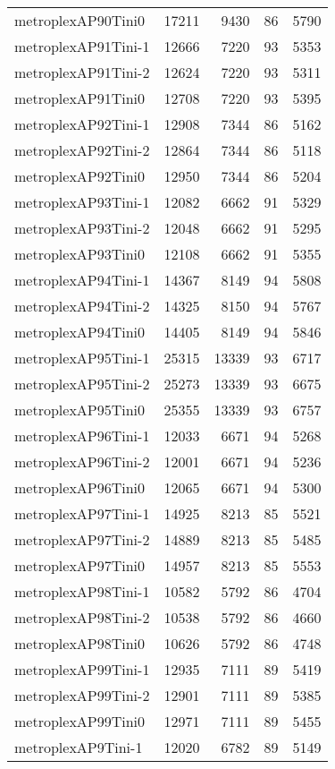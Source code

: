 \begin{longtable}{lrrrr}
metroplexAP90Tini0 & 17211 & 9430 & 86 & 5790 \\
metroplexAP91Tini-1 & 12666 & 7220 & 93 & 5353 \\
metroplexAP91Tini-2 & 12624 & 7220 & 93 & 5311 \\
metroplexAP91Tini0 & 12708 & 7220 & 93 & 5395 \\
metroplexAP92Tini-1 & 12908 & 7344 & 86 & 5162 \\
metroplexAP92Tini-2 & 12864 & 7344 & 86 & 5118 \\
metroplexAP92Tini0 & 12950 & 7344 & 86 & 5204 \\
metroplexAP93Tini-1 & 12082 & 6662 & 91 & 5329 \\
metroplexAP93Tini-2 & 12048 & 6662 & 91 & 5295 \\
metroplexAP93Tini0 & 12108 & 6662 & 91 & 5355 \\
metroplexAP94Tini-1 & 14367 & 8149 & 94 & 5808 \\
metroplexAP94Tini-2 & 14325 & 8150 & 94 & 5767 \\
metroplexAP94Tini0 & 14405 & 8149 & 94 & 5846 \\
metroplexAP95Tini-1 & 25315 & 13339 & 93 & 6717 \\
metroplexAP95Tini-2 & 25273 & 13339 & 93 & 6675 \\
metroplexAP95Tini0 & 25355 & 13339 & 93 & 6757 \\
metroplexAP96Tini-1 & 12033 & 6671 & 94 & 5268 \\
metroplexAP96Tini-2 & 12001 & 6671 & 94 & 5236 \\
metroplexAP96Tini0 & 12065 & 6671 & 94 & 5300 \\
metroplexAP97Tini-1 & 14925 & 8213 & 85 & 5521 \\
metroplexAP97Tini-2 & 14889 & 8213 & 85 & 5485 \\
metroplexAP97Tini0 & 14957 & 8213 & 85 & 5553 \\
metroplexAP98Tini-1 & 10582 & 5792 & 86 & 4704 \\
metroplexAP98Tini-2 & 10538 & 5792 & 86 & 4660 \\
metroplexAP98Tini0 & 10626 & 5792 & 86 & 4748 \\
metroplexAP99Tini-1 & 12935 & 7111 & 89 & 5419 \\
metroplexAP99Tini-2 & 12901 & 7111 & 89 & 5385 \\
metroplexAP99Tini0 & 12971 & 7111 & 89 & 5455 \\
metroplexAP9Tini-1 & 12020 & 6782 & 89 & 5149 \\

\end{longtable}
